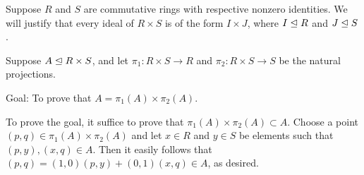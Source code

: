 \begin{exmp}
    Suppose $R$ and $S$ are commutative rings with respective nonzero identities.
    We will justify that every ideal of $R\times S$ is of the form $I\times J$, where $I\trianglelefteq R$ and $J\trianglelefteq S$.

    Suppose $A\trianglelefteq R\times S$, and let $\pi_1: R\times S\rightarrow R$ and $\pi_2: R\times S\rightarrow S$ be the natural projections.
    \begin{center}
        Goal: To prove that $A=\pi_1(A)\times\pi_2(A)$.
    \end{center}
    To prove the goal, it suffice to prove that $\pi_1(A)\times\pi_2(A)\subset A$.
    Choose a point $(p, q)\in\pi_1(A)\times\pi_2(A)$ and let $x\in R$ and $y\in S$ be elements such that $(p, y), (x, q)\in A$.
    Then it easily follows that $(p, q)=(1, 0)(p, y)+(0, 1)(x, q)\in A$, as desired.
\end{exmp}